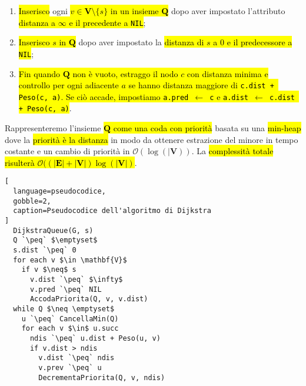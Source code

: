 \documentclass[a4paper,11pt,twoside]{article}
\theoremstyle{plain}
\theoremstyle{definition}
\theoremstyle{remark}
\newcommand{\peq}{$\gets$}
\begin{document}
\begin{enumerate}
  \item \hl{Inserisco} ogni \hl{$v \in \mathbf{V} \setminus \{s\}$ in un insieme
    $\mathbf{Q}$} dopo aver impostato l'attributo \hl{distanza a $\infty$ e il
    precedente a \texttt{NIL}};
  \item \hl{Inserisco $s$ in $\mathbf{Q}$} dopo aver impostato la \hl{distanza
    di $s$ a 0 e il predecessore a \texttt{NIL}};
  \item \hl{Fin quando $\mathbf{Q}$ non è vuoto, estraggo il nodo $c$ con
    distanza minima e controllo per ogni adiacente $a$ se hanno distanza
    maggiore di \texttt{c.dist + Peso(c, a)}. Se ciò accade, impostiamo
    \texttt{a.pred \peq{} c} e \texttt{a.dist \peq{} c.dist + Peso(c, a)}}.
\end{enumerate}

\noindent Rappresenteremo l'insieme \hl{$\mathbf{Q}$ come una coda con priorità}
basata su una \hl{min-heap} dove la \hl{priorità è la distanza} in modo da
ottenere estrazione del minore in tempo costante e un cambio di priorità in
$\mathcal{O}(\log(|\mathbf{V}))$. La \hl{complessità totale risulterà
$\mathcal{O}((|\mathbf{E}| + |\mathbf{V}|)\log(|\mathbf{V}|)$}.

\begin{lstlisting}[
  language=pseudocodice,
  gobble=2,
  caption=Pseudocodice dell'algoritmo di Dijkstra
]
  DijkstraQueue(G, s)
  Q `\peq` $\emptyset$
  s.dist `\peq` 0
  for each v $\in \mathbf{V}$
    if v $\neq$ s
      v.dist `\peq` $\infty$
      v.pred `\peq` NIL
      AccodaPriorita(Q, v, v.dist)
  while Q $\neq \emptyset$
    u `\peq` CancellaMin(Q)
    for each v $\in$ u.succ
      ndis `\peq` u.dist + Peso(u, v)
      if v.dist > ndis
        v.dist `\peq` ndis
        v.prev `\peq` u
        DecrementaPriorita(Q, v, ndis)
\end{lstlisting}
\end{document}
